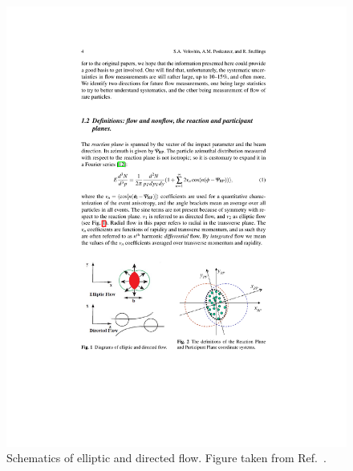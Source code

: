 \begin{figure}
\begin{center}
\begin{minipage}[b]{0.4\textwidth}
\includegraphics[width=\textwidth]{figures/theory/flow_v1_v2}
\caption{Schematics of elliptic and directed flow.
Figure taken from Ref.~\cite{Voloshin:2008dg}.}
\label{fig:flow_v1_v2}
  \end{minipage}
  \end{center}
\end{figure}

